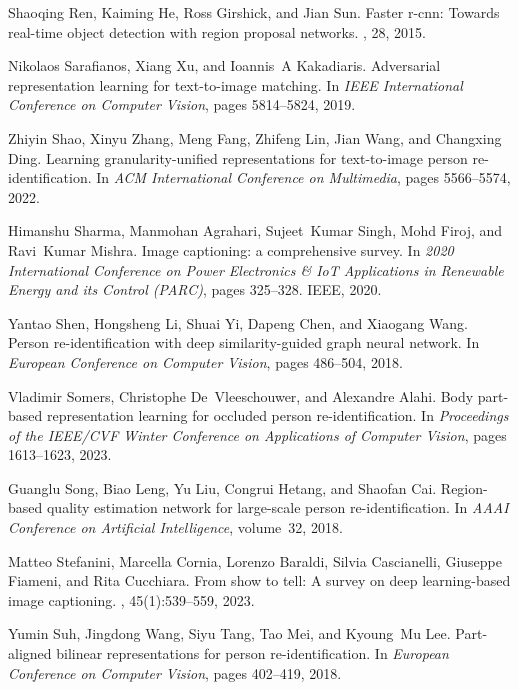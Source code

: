 \documentclass[10pt,twocolumn,letterpaper]{article}
\begin{document}
\begin{thebibliography}{10}
Shaoqing Ren, Kaiming He, Ross Girshick, and Jian Sun.
\newblock Faster r-cnn: Towards real-time object detection with region proposal
  networks.
, 28, 2015.

Nikolaos Sarafianos, Xiang Xu, and Ioannis~A Kakadiaris.
\newblock Adversarial representation learning for text-to-image matching.
\newblock In {\em IEEE International Conference on Computer Vision}, pages
  5814--5824, 2019.

Zhiyin Shao, Xinyu Zhang, Meng Fang, Zhifeng Lin, Jian Wang, and Changxing
  Ding.
\newblock Learning granularity-unified representations for text-to-image person
  re-identification.
\newblock In {\em ACM International Conference on Multimedia}, pages
  5566--5574, 2022.

Himanshu Sharma, Manmohan Agrahari, Sujeet~Kumar Singh, Mohd Firoj, and
  Ravi~Kumar Mishra.
\newblock Image captioning: a comprehensive survey.
\newblock In {\em 2020 International Conference on Power Electronics \& IoT
  Applications in Renewable Energy and its Control (PARC)}, pages 325--328.
  IEEE, 2020.

Yantao Shen, Hongsheng Li, Shuai Yi, Dapeng Chen, and Xiaogang Wang.
\newblock Person re-identification with deep similarity-guided graph neural
  network.
\newblock In {\em European Conference on Computer Vision}, pages 486--504,
  2018.

Vladimir Somers, Christophe De~Vleeschouwer, and Alexandre Alahi.
\newblock Body part-based representation learning for occluded person
  re-identification.
\newblock In {\em Proceedings of the IEEE/CVF Winter Conference on Applications
  of Computer Vision}, pages 1613--1623, 2023.

Guanglu Song, Biao Leng, Yu Liu, Congrui Hetang, and Shaofan Cai.
\newblock Region-based quality estimation network for large-scale person
  re-identification.
\newblock In {\em AAAI Conference on Artificial Intelligence}, volume~32, 2018.

Matteo Stefanini, Marcella Cornia, Lorenzo Baraldi, Silvia Cascianelli,
  Giuseppe Fiameni, and Rita Cucchiara.
\newblock From show to tell: A survey on deep learning-based image captioning.
,
  45(1):539--559, 2023.

Yumin Suh, Jingdong Wang, Siyu Tang, Tao Mei, and Kyoung~Mu Lee.
\newblock Part-aligned bilinear representations for person re-identification.
\newblock In {\em European Conference on Computer Vision}, pages 402--419,
  2018.


\end{thebibliography}
\end{document}
